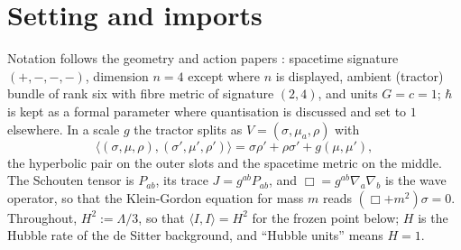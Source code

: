 \documentclass[11pt]{article}
\theoremstyle{definition}
\newcommand{\ip}[2]{\langle #1, #2\rangle}
\begin{document}
\section{Setting and imports}\label{sec:setting}

Notation follows the geometry and action papers \cite{ButlerT6, ButlerT10}: spacetime signature $(+,-,-,-)$, dimension $n = 4$ except where $n$ is displayed, ambient (tractor) bundle of rank six with fibre metric of signature $(2,4)$, and units $G = c = 1$; $\hbar$ is kept as a formal parameter where quantisation is discussed and set to $1$ elsewhere. In a scale $g$ the tractor splits as $V = (\sigma, \mu_{a}, \rho)$ with
\begin{equation}\label{eq:tractormetric}
\ip{(\sigma,\mu,\rho)}{(\sigma',\mu',\rho')} = \sigma\rho' + \rho\sigma' + g(\mu,\mu'),
\end{equation}
the hyperbolic pair on the outer slots and the spacetime metric on the middle. The Schouten tensor is $P_{ab}$, its trace $J = g^{ab}P_{ab}$, and $\Box = g^{ab}\nabla_{a}\nabla_{b}$ is the wave operator, so that the Klein-Gordon equation for mass $m$ reads $(\Box + m^{2})\sigma = 0$. Throughout, $H^{2} := \Lambda/3$, so that $\ip{I}{I} = H^{2}$ for the frozen point below; $H$ is the Hubble rate of the de Sitter background, and ``Hubble units'' means $H = 1$.
\end{document}
